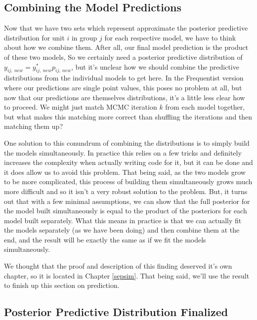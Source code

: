 \documentclass[12pt,twoside]{reedthesis}
\begin{document}
\hypertarget{combining-the-model-predictions}{%
\subsection{Combining the Model Predictions}\label{combining-the-model-predictions}}

Now that we have two sets which represent approximate the posterior predictive distribution for unit \(i\) in group \(j\) for each respective model, we have to think about how we combine them. After all, our final model prediction is the product of these two models, So we certainly need a posterior predictive distribution of \(y_{ij, \ new} = y_{ij, \ new}^*p_{ij, \ new}\), but it's unclear how we should combine the predictive distributions from the individual models to get here. In the Frequentist version where our predictions are single point values, this poses no problem at all, but now that our predictions are themselves distributions, it's a little less clear how to proceed. We might just match MCMC iteration \(k\) from each model together, but what makes this matching more correct than shuffling the iterations and then matching them up?

One solution to this conundrum of combining the distributions is to simply build the models simultaneously. In practice this relies on a few tricks and definitely increases the complexity when actually writing code for it, but it can be done and it does allow us to avoid this problem. That being said, as the two models grow to be more complicated, this process of building them simultaneously grows much more difficult and so it isn't a very robust solution to the problem. But, it turns out that with a few minimal assumptions, we can show that the full posterior for the model built simultaneously is equal to the product of the posteriors for each model built separately. What this means in practice is that we can actually fit the models separately (as we have been doing) and then combine them at the end, and the result will be exactly the same as if we fit the models simultaneously.

We thought that the proof and description of this finding deserved it's own chapter, so it is located in Chapter \ref{sepsim}. That being said, we'll use the result to finish up this section on prediction.

\hypertarget{wrapone}{%
\subsection{Posterior Predictive Distribution Finalized}\label{wrapone}}
\end{document}
